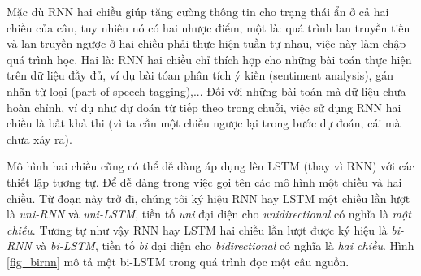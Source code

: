 Mặc dù RNN hai chiều giúp tăng cường thông tin cho trạng thái ẩn ở cả hai chiều của câu, tuy nhiên nó có hai nhược điểm, một là: quá trình lan truyền tiến và lan truyền ngược ở hai chiều phải thực hiện tuần tự nhau, việc này làm chập quá trình học. Hai là: RNN hai chiều chỉ thích hợp cho những bài toán thực hiện trên dữ liệu đầy đủ, ví dụ bài tóan phân tích ý kiến (sentiment analysis), gán nhãn từ loại (part-of-speech tagging),... Đối với những bài toán mà dữ liệu chưa hoàn chỉnh, ví dụ như dự đoán từ tiếp theo trong chuỗi, việc sử dụng RNN hai chiều là bất khả thi (vì ta cần một chiều ngược lại trong bước dự đoán, cái mà chưa xảy ra).

Mô hình hai chiều cũng có thể dễ dàng áp dụng lên LSTM (thay vì RNN) với các thiết lập tương tự. Để dễ dàng trong việc gọi tên các mô hình một chiều và hai chiều. Từ đoạn này trở đi, chúng tôi ký hiệu RNN hay LSTM một chiều lần lượt là \textit{uni-RNN} và \textit{uni-LSTM}, tiền tố \textit{uni} đại diện cho \textit{unidirectional} có nghĩa là \textit{một chiều}. Tương tự như vậy RNN hay LSTM hai chiều lần lượt được ký hiệu là \textit{bi-RNN} và \textit{bi-LSTM}, tiền tố \textit{bi} đại diện cho \textit{bidirectional} có nghĩa là \textit{hai chiều}. Hình \ref{fig_birnn} mô tả một bi-LSTM trong quá trình đọc một câu nguồn.


